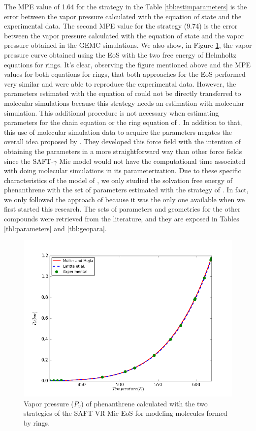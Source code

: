 The MPE value of 1.64 for the  strategy in the Table \ref{tbl:estimparameters} is the error between the vapor pressure calculated with the equation of state and the experimental data. The second MPE value for the  strategy (9.74) is the error between the vapor pressure calculated with the equation of state and the vapor pressure obtained in the GEMC simulations. We also show, in Figure \ref{fig:fitede}, the vapor pressure curve obtained using the EoS with the two free energy of Helmholtz equations for rings. It's clear, observing the figure mentioned above and the MPE     values for both equations for rings, that both approaches for the EoS performed very similar and were able to reproduce the experimental data. However, the parameters estimated with the equation of   could not be directly transferred to molecular simulations because this strategy needs an estimation with molecular simulation. This additional procedure is not necessary when estimating parameters for the chain equation \cite{avendano2011} or the ring equation of . In addition to that, this use of molecular simulation data to acquire the parameters negates the overall idea proposed by \cite{avendano2011}. They developed this force field with the intention of obtaining the parameters in a more straightforward way than other force fields since the SAFT-$\gamma$ Mie model would not have the computational time associated with doing molecular simulations in its parameterization. Due to these specific characteristics of the model of , we only studied the solvation free energy of phenanthrene with the set of parameters estimated with the strategy of . In fact, we only followed the approach of  because it was the only one available when we first started this research. The sets of parameters and geometries for the other compounds were retrieved from the literature, and they are exposed in Tables \ref{tbl:parameters} and \ref{tbl:geopara}.

\begin{figure}[h]
	\centering
	\includegraphics[width=0.8\linewidth]{Figures/ede}
	\caption{Vapor pressure ($P_{v}$) of phenanthrene calculated with the two strategies of the SAFT-VR Mie EoS for modeling molecules formed by rings.} 
	\label{fig:fitede}
\end{figure}

